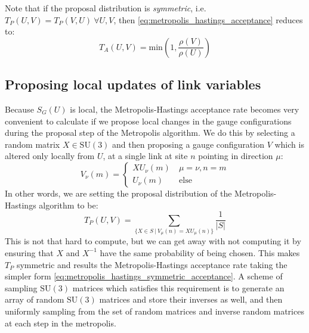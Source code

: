 \documentclass[11pt]{article}
\begin{document}
Note that if the proposal distribution is \textit{symmetric}, i.e. $T_P(U,V)=T_P(V,U)\ \forall U,V$, then \eqref{eq:metropolis_hastings_acceptance} reduces to:
\begin{equation}\label{eq:metropolis_hastings_symmetric_acceptance}T_A(U,V)=\mathrm{min}\left(1,\frac{\rho(V)}{\rho(U)}\right)\end{equation}

\subsection{Proposing local updates of link variables}

\label{sec:implement_metropolis}

Because $S_G(U)$ is local, the Metropolis-Hastings acceptance rate becomes very convenient to calculate if we propose local changes in the gauge configurations during the proposal step of the Metropolis algorithm. We do this by selecting a random matrix $X\in\mathrm{SU}(3)$ and then proposing a gauge configuration $V$ which is altered only locally from $U$, at a single link at site $n$ pointing in direction $\mu$:
\begin{equation}\label{eq:local_proposal}V_{\nu}(m)=\begin{cases}XU_\nu(m)&\ \mu=\nu,n=m\\U_\nu(m)&\ \mathrm{else}\end{cases}\end{equation}
In other words, we are setting the proposal distribution of the Metropolis-Hastings algorithm to be:
\begin{equation}T_P(U,V)=\sum_{\{X\in S\ |\ V_\mu(n)=XU_\mu(n)\}}\frac{1}{|S|}\end{equation}
This is not that hard to compute, but we can get away with not computing it by ensuring that $X$ and $X^{-1}$ have the same probability of being chosen. This makes $T_P$ symmetric and results the Metropolis-Hastings acceptance rate taking the simpler form \eqref{eq:metropolis_hastings_symmetric_acceptance}. A scheme of sampling $\mathrm{SU}(3)$ matrices which satisfies this requirement is to generate an array of random $\mathrm{SU}(3)$ matrices and store their inverses as well, and then uniformly sampling from the set of random matrices and inverse random matrices at each step in the metropolis. 
\end{document}
